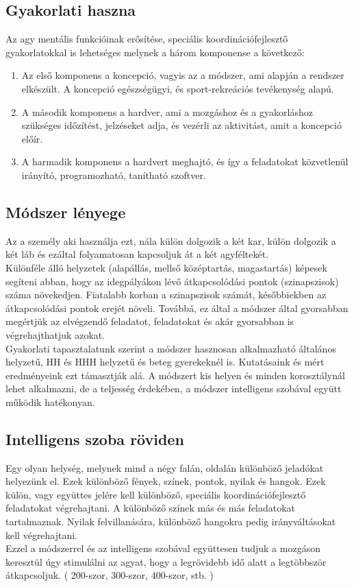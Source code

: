 \documentclass[tocnopagenum]{thesis-ekf}
\theoremstyle{definition}
\theoremstyle{remark}
\begin{document}
	\subsection*{Gyakorlati haszna}
	Az agy mentális funkcióinak erősítése, speciális koordinációfejlesztő gyakorlatokkal is lehetséges melynek a három komponense a következő: 
	\begin{enumerate}
	 
			\item	Az első komponens a koncepció, vagyis az a módszer, ami alapján a rendszer elkészült. A koncepció egészségügyi, és sport-rekreációs tevékenység alapú.
			\item	A második komponens a hardver, ami a mozgáshoz és a gyakorláshoz szükséges időzítést, jelzéseket adja, és vezérli az aktivitást, amit a koncepció előír.
			\item	A harmadik komponens a hardvert meghajtó, és így a feladatokat közvetlenül irányító, programozható, tanítható szoftver.
	\end{enumerate}
	\subsection*{Módszer lényege}
	Az a személy aki használja ezt, nála külön dolgozik a két kar, külön dolgozik a két láb és ezáltal folyamatosan kapcsoljuk át a két agyféltekét.
	\\
	Különféle álló helyzetek (alapállás, mellső középtartás, magastartás) képesek segíteni abban, hogy az idegpályákon lévő átkapcsolódási pontok (szinapszisok) száma növekedjen. Fiatalabb korban a szinapszisok számát, későbbiekben az átkapcsolódási pontok erejét növeli.
	 Továbbá, ez által a módszer által gyorsabban megértjük az elvégzendő  feladatot, feladatokat és akár gyorsabban is végrehajthatjuk azokat.
	 \\
	  Gyakorlati tapasztalatunk szerint a módszer hasznosan alkalmazható általános helyzetű, HH és HHH helyzetű és beteg gyerekeknél is. Kutatásaink és mért eredményeink ezt támasztják alá.
	A módszert kis helyen és minden korosztálynál lehet alkalmazni, de a teljesség érdekében, a módszer intelligens szobával együtt működik hatékonyan.
	\subsection*{Intelligens szoba röviden}
	Egy olyan helység, melynek mind a négy falán, oldalán különböző jeladókat helyezünk el.
	Ezek különböző fények, színek, pontok, nyilak és hangok. Ezek külön, vagy együttes jelére kell különböző, speciális koordinációfejlesztő feladatokat végrehajtani.
	A különböző színek más és más feladatokat tartalmaznak. Nyilak felvillanására, különböző hangokra pedig irányváltásokat kell végrehajtani.
	\\
	Ezzel a módszerrel és az intelligens szobával együttesen tudjuk a mozgáson keresztül úgy stimulálni az agyat, hogy a legrövidebb idő alatt a legtöbbször átkapcsoljuk. ( 200-szor, 300-szor, 400-szor, stb. )
	\par
\end{document}
